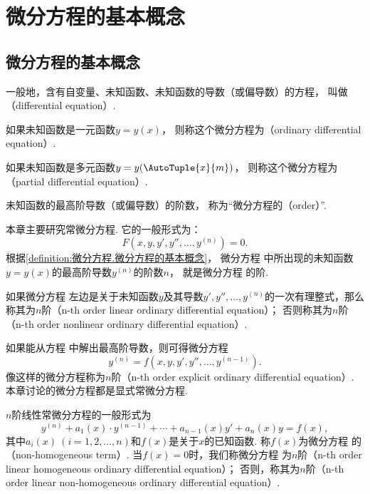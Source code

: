 \section{微分方程的基本概念}
\subsection{微分方程的基本概念}
\begin{definition}\label{definition:微分方程.微分方程的基本概念}
一般地，含有自变量、未知函数、未知函数的导数（或偏导数）的方程，
叫做（differential equation）.

如果未知函数是一元函数\(y = y(x)\)，
则称这个微分方程为（ordinary differential equation）.

如果未知函数是多元函数\(y = y(\AutoTuple{x}{m})\)，
则称这个微分方程为（partial differential equation）.

未知函数的最高阶导数（或偏导数）的阶数，
称为“微分方程的（order）”.
\end{definition}

本章主要研究常微分方程.
它的一般形式为：
\begin{equation}\label{equation:微分方程.微分方程的一般形式}
F\left( x,y,y',y'',\dotsc,y^{(n)} \right)=0.
\end{equation}
根据\cref{definition:微分方程.微分方程的基本概念}，
微分方程  中所出现的未知函数
\(y = y(x)\)的最高阶导数\(y^{(n)}\)的阶数\(n\)，
就是微分方程  的阶.

如果微分方程  左边是关于未知函数\(y\)及其导数\(y',y'',\dotsc,y^{(n)}\)的一次有理整式，那么称其为\(n\)阶（n-th order linear ordinary differential equation）；
否则称其为\(n\)阶（n-th order nonlinear ordinary differential equation）.

如果能从方程  中解出最高阶导数，则可得微分方程
\begin{equation}\label{equation:微分方程.分离出最高阶导数}
y^{(n)} = f\left( x,y,y',y'',\dotsc,y^{(n-1)} \right).
\end{equation}
像这样的微分方程称为\(n\)阶（n-th order explicit ordinary differential equation）.
本章讨论的微分方程都是显式常微分方程.

\(n\)阶线性常微分方程的一般形式为
\begin{equation}\label{equation:微分方程.线性常微分方程的一般形式}
y^{(n)} + a_1(x) \cdot y^{(n-1)}
+ \dotsb + a_{n-1}(x) y'
+ a_n(x) y
= f(x),
\end{equation}
其中\(a_i(x)\ (i=1,2,\dotsc,n)\)和\(f(x)\)是关于\(x\)的已知函数.
称\(f(x)\)为微分方程  的（non-homogeneous term）.
当\(f(x) = 0\)时，我们称微分方程  为\(n\)阶（n-th order linear homogeneous ordinary differential equation）；
否则，称其为\(n\)阶（n-th order linear non-homogeneous ordinary differential equation）.

